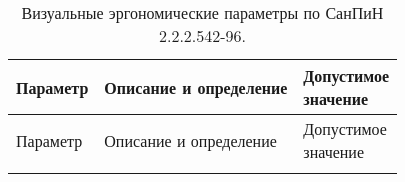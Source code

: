 \begin{center}
    \begin{longtable}{|l|l|l|}
	    \caption{\label{tab:visual} Визуальные эргономические параметры по СанПиН 2.2.2.542-96.} \\
            \hline
            Параметр & Описание и определение & \specialcell{Допустимое\\значение} \\
            \hline
            \endfirsthead
            Параметр & Описание и определение & \specialcell{Допустимое\\значение} \\
            \hline
            \endhead

            \endfoot

            \endlastfoot


\end{longtable}
\end{center}
